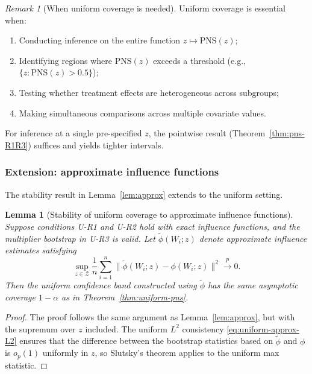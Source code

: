 \documentclass[accepted]{uai2026} %
\theoremstyle{plain}
\newtheorem{lemma}[theorem]{Lemma}
\theoremstyle{definition}
\theoremstyle{remark}
\newtheorem{remark}[theorem]{Remark}
\begin{document}
\begin{remark}[When uniform coverage is needed]
Uniform coverage is essential when:
\begin{enumerate}
  \item Conducting inference on the entire function $z \mapsto \mathrm{PNS}(z)$;
  \item Identifying regions where $\mathrm{PNS}(z)$ exceeds a threshold
  (e.g., $\{z : \mathrm{PNS}(z) > 0.5\}$);
  \item Testing whether treatment effects are heterogeneous across subgroups;
  \item Making simultaneous comparisons across multiple covariate values.
\end{enumerate}
For inference at a single pre-specified $z$, the pointwise result
(Theorem~\ref{thm:pns-R1R3}) suffices and yields tighter intervals.
\end{remark}





\subsubsection{Extension: approximate influence functions}
\label{subsubsec:uniform-approx}

The stability result in Lemma~\ref{lem:approx} extends to the uniform setting.

\begin{lemma}[Stability of uniform coverage to approximate influence functions]
\label{lem:uniform-approx}
Suppose conditions U-R1 and U-R2 hold with exact influence functions, and
the multiplier bootstrap in U-R3 is valid. Let $\tilde\phi(W_i;z)$ denote
approximate influence estimates satisfying
\begin{equation}
\label{eq:uniform-approx-L2}
  \sup_{z \in \mathcal{Z}} \frac{1}{n}\sum_{i=1}^n
    \|\tilde\phi(W_i;z) - \phi(W_i;z)\|^2 \xrightarrow{p} 0.
\end{equation}
Then the uniform confidence band constructed using $\tilde\phi$ has the same
asymptotic coverage $1-\alpha$ as in Theorem~\ref{thm:uniform-pns}.
\end{lemma}

\begin{proof}
The proof follows the same argument as Lemma~\ref{lem:approx}, but with
the supremum over $z$ included. The uniform $L^2$ consistency
\eqref{eq:uniform-approx-L2} ensures that the difference between the
bootstrap statistics based on $\tilde\phi$ and $\phi$ is $o_p(1)$ uniformly
in $z$, so Slutsky's theorem applies to the uniform max statistic.
\end{proof}
\end{document}

